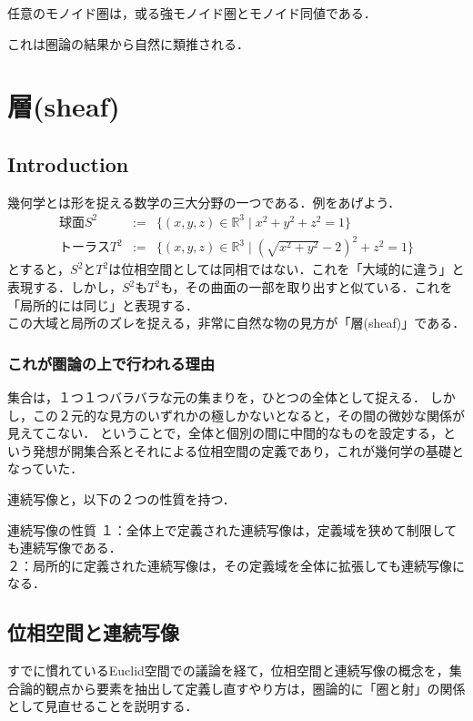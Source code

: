 \documentclass[uplatex, dvipdfmx]{jsreport}
\begin{document}
\begin{proposition}
    任意のモノイド圏は，或る強モノイド圏とモノイド同値である．
\end{proposition}
これは圏論の結果から自然に類推される．

\part{層(sheaf)}

\chapter{Introduction}

幾何学とは形を捉える数学の三大分野の一つである．例をあげよう．
\begin{eqnarray*}球面S^2 &:=& \{ (x,y,z) \in \mathbb{R}^3 \mid x^2+y^2+z^2 = 1 \} \\ トーラスT^2 &:=& \{ (x,y,z)\in\mathbb{R}^3 \mid (\sqrt{x^2+y^2}-2)^2 + z^2 = 1 \}\end{eqnarray*}
とすると，$S^2$と$T^2$は位相空間としては同相ではない．これを「大域的に違う」と表現する．しかし，$S^2$も$T^2$も，その曲面の一部を取り出すと似ている．これを「局所的には同じ」と表現する．\\
この大域と局所のズレを捉える，非常に自然な物の見方が「層(sheaf)」である．

\section{これが圏論の上で行われる理由}

集合は，１つ１つバラバラな元の集まりを，ひとつの全体として捉える．
しかし，この２元的な見方のいずれかの極しかないとなると，その間の微妙な関係が見えてこない．
ということで，全体と個別の間に中間的なものを設定する，という発想が開集合系とそれによる位相空間の定義であり，これが幾何学の基礎となっていた．


連続写像と，以下の２つの性質を持つ．
\begin{itembox}[l]{連続写像の性質}
    １：全体上で定義された連続写像は，定義域を狭めて制限しても連続写像である．\\
    ２：局所的に定義された連続写像は，その定義域を全体に拡張しても連続写像になる．
\end{itembox}

\chapter{位相空間と連続写像}
すでに慣れているEuclid空間での議論を経て，位相空間と連続写像の概念を，集合論的観点から要素を抽出して定義し直すやり方は，圏論的に「圏と射」の関係として見直せることを説明する．
\end{document}
